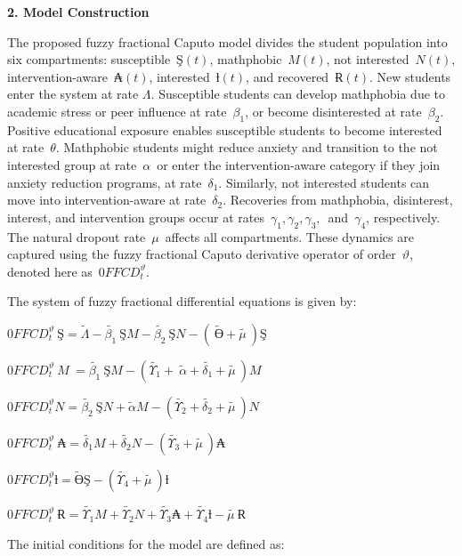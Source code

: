 \textbf{2. Model Construction}

The proposed fuzzy fractional Caputo model divides the student population into six compartments: susceptible~\(Ş(t)\), mathphobic~\(M(t)\), not interested~\(N(t)\), intervention-aware~\(₳(t)\), interested~\(ƚ(t)\), and recovered~\(Ɍ(t)\). New students enter the system at rate \(\Lambda\). Susceptible students can develop mathphobia due to academic stress or peer influence at rate~\(\beta_{1}\), or become disinterested at rate~\(\beta_{2}\). Positive educational exposure enables susceptible students to become interested at rate~\(\theta\). Mathphobic students might reduce anxiety and transition to the not interested group at rate~\(\alpha\)~or enter the intervention-aware category if they join anxiety reduction programs, at rate~\(\delta_{1}\). Similarly, not interested students can move into intervention-aware at rate~\(\delta_{2}\). Recoveries from mathphobia, disinterest, interest, and intervention groups occur at rates~\(\gamma_{1},\gamma_{2},\gamma_{3},\)~and~\(\gamma_{4}\), respectively. The natural dropout rate~\(\mu\)~affects all compartments. These dynamics are captured using the fuzzy fractional Caputo derivative operator of order~\(\vartheta\), denoted here as~\(0FFCD_{t}^{\vartheta}\).

The system of fuzzy fractional differential equations is given by:

\(0FFCD_{t}^{\vartheta}\ Ş = \widetilde{\Lambda} - \widetilde{\beta_{1}}\ ŞM - \widetilde{\beta_{2}}\ ŞN - \left( \ \widetilde{Ө} + \widetilde{\mu\ } \right)Ş\)

\(0FFCD_{t}^{\vartheta}\ M\  = \widetilde{\beta_{1}}\ ŞM - \left( \widetilde{\Upsilon_{1}} + \ \widetilde{\alpha} + \widetilde{\delta_{1}} + \widetilde{\mu\ } \right)M\)

\(0FFCD_{t}^{\vartheta}N = \widetilde{\beta_{2}}\ ŞN + \widetilde{\alpha}M - \left( \widetilde{\Upsilon_{2}} + \widetilde{\delta_{2}} + \widetilde{\mu\ } \right)N\)

\(0FFCD_{t}^{\vartheta}\ ₳ = \widetilde{\delta_{1}}M + \widetilde{\delta_{2}}N - \left( \widetilde{\Upsilon_{3}} + \widetilde{\mu\ } \right)₳\)

\(0FFCD_{t}^{\vartheta}ƚ = \widetilde{Ө}Ş - \left( \widetilde{\Upsilon_{4}} + \widetilde{\mu\ } \right)ƚ\)

\(0FFCD_{t}^{\vartheta}\ Ɍ = \widetilde{\Upsilon_{1}}M + \widetilde{\Upsilon_{2}}N + \widetilde{\Upsilon_{3}}₳ + \widetilde{\Upsilon_{4}}ƚ - \widetilde{\mu\ }Ɍ\)

The initial conditions for the model are defined as:

